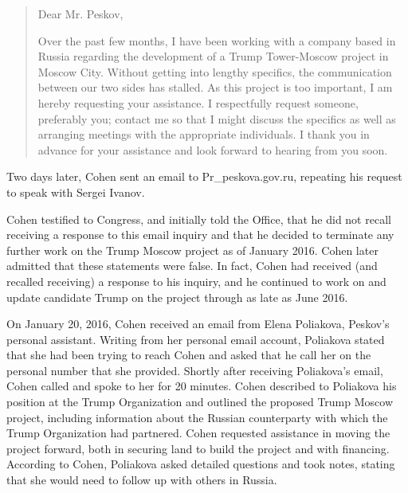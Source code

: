 \begin{quote}
Dear Mr. Peskov,

Over the past few months, I have been working with a company based in Russia regarding the development of a Trump Tower-Moscow project in Moscow City.
Without getting into lengthy specifics, the communication between our two sides has stalled.
As this project is too important, I am hereby requesting your assistance.
I respectfully request someone, preferably you; contact me so that I might discuss the specifics as well as arranging meetings with the appropriate individuals.
I thank you in advance for your assistance and look forward to hearing from you soon.%
\end{quote}

Two days later, Cohen sent an email to Pr\_peskova\@prpress.gov.ru, repeating his request to speak with Sergei Ivanov.%

Cohen testified to Congress, and initially told the Office, that he did not recall receiving a response to this email inquiry and that he decided to terminate any further work on the Trump Moscow project as of January 2016.
Cohen later admitted that these statements were false.
In fact, Cohen had received (and recalled receiving) a response to his inquiry, and he continued to work on and update candidate Trump on the project through as late as June 2016.%

On January 20, 2016, Cohen received an email from Elena Poliakova, Peskov's personal assistant.
Writing from her personal email account, Poliakova stated that she had been trying to reach Cohen and asked that he call her on the personal number that she provided.%
Shortly after receiving Poliakova's email, Cohen called and spoke to her for 20 minutes.%
Cohen described to Poliakova his position at the Trump Organization and outlined the proposed Trump Moscow project, including information about the Russian counterparty with which the Trump Organization had partnered.
Cohen requested assistance in moving the project forward, both in securing land to build the project and with financing.
According to Cohen, Poliakova asked detailed questions and took notes, stating that she would need to follow up with others in Russia.%

